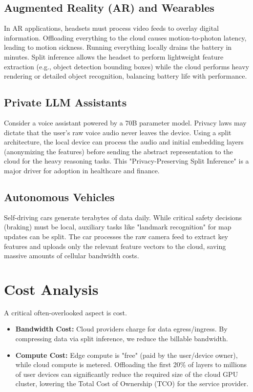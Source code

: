 \documentclass[runningheads]{llncs}
\begin{document}
\subsection{Augmented Reality (AR) and Wearables}
In AR applications, headsets must process video feeds to overlay digital information. Offloading everything to the cloud causes motion-to-photon latency, leading to motion sickness. Running everything locally drains the battery in minutes. Split inference allows the headset to perform lightweight feature extraction (e.g., object detection bounding boxes) while the cloud performs heavy rendering or detailed object recognition, balancing battery life with performance.

\subsection{Private LLM Assistants}
Consider a voice assistant powered by a 70B parameter model. Privacy laws may dictate that the user's raw voice audio never leaves the device. Using a split architecture, the local device can process the audio and initial embedding layers (anonymizing the features) before sending the abstract representation to the cloud for the heavy reasoning tasks. This "Privacy-Preserving Split Inference" is a major driver for adoption in healthcare and finance.

\subsection{Autonomous Vehicles}
Self-driving cars generate terabytes of data daily. While critical safety decisions (braking) must be local, auxiliary tasks like "landmark recognition" for map updates can be split. The car processes the raw camera feed to extract key features and uploads only the relevant feature vectors to the cloud, saving massive amounts of cellular bandwidth costs.

\section{Cost Analysis}
A critical often-overlooked aspect is cost.
\begin{itemize}
    \item \textbf{Bandwidth Cost:} Cloud providers charge for data egress/ingress. By compressing data via split inference, we reduce the billable bandwidth.
    \item \textbf{Compute Cost:} Edge compute is "free" (paid by the user/device owner), while cloud compute is metered. Offloading the first 20\% of layers to millions of user devices can significantly reduce the required size of the cloud GPU cluster, lowering the Total Cost of Ownership (TCO) for the service provider.
\end{itemize}
\end{document}
